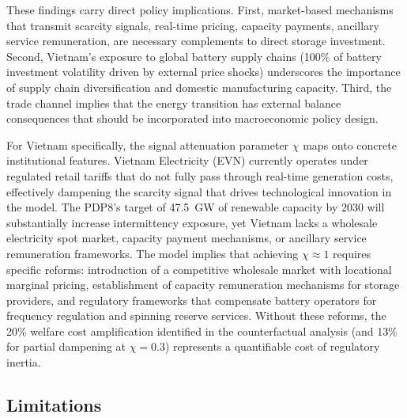 \documentclass[12pt, a4paper]{article}
\begin{document}
	These findings carry direct policy implications. First, market-based mechanisms that transmit scarcity signals, real-time pricing, capacity payments, ancillary service remuneration, are necessary complements to direct storage investment. Second, Vietnam's exposure to global battery supply chains (100\% of battery investment volatility driven by external price shocks) underscores the importance of supply chain diversification and domestic manufacturing capacity. Third, the trade channel implies that the energy transition has external balance consequences that should be incorporated into macroeconomic policy design.

	For Vietnam specifically, the signal attenuation parameter $\chi$ maps onto concrete institutional features. Vietnam Electricity (EVN) currently operates under regulated retail tariffs that do not fully pass through real-time generation costs, effectively dampening the scarcity signal that drives technological innovation in the model. The PDP8's target of 47.5~GW of renewable capacity by 2030 will substantially increase intermittency exposure, yet Vietnam lacks a wholesale electricity spot market, capacity payment mechanisms, or ancillary service remuneration frameworks. The model implies that achieving $\chi \approx 1$ requires specific reforms: introduction of a competitive wholesale market with locational marginal pricing, establishment of capacity remuneration mechanisms for storage providers, and regulatory frameworks that compensate battery operators for frequency regulation and spinning reserve services. Without these reforms, the 20\% welfare cost amplification identified in the counterfactual analysis (and 13\% for partial dampening at $\chi = 0.3$) represents a quantifiable cost of regulatory inertia.

	\subsection*{Limitations}
\end{document}
